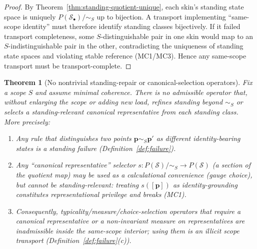 \documentclass[11pt]{article}
\newtheorem{theorem}[definition]{Theorem}
\theoremstyle{remark}
\newcommand{\Skin}{\mathcal{S}}
\begin{document}
\begin{proof}
By Theorem~\ref{thm:standing-quotient-unique}, each skin's standing state space is uniquely
$P(\Skin_\bullet)/\!\sim_S$ up to bijection.
A transport implementing ``same-scope identity'' must therefore identify standing classes bijectively.
If it failed transport completeness, some $S$-distinguishable pair in one skin would map to an
$S$-indistinguishable pair in the other, contradicting the uniqueness of standing state spaces and violating
stable reference (MC1/MC3). Hence any same-scope transport must be transport-complete.
\end{proof}

\begin{theorem}[No nontrivial standing-repair or canonical-selection operators]\label{thm:no-repair}
Fix a scope $S$ and assume minimal coherence.
There is no admissible operator that, without enlarging the scope or adding new load, refines standing beyond
$\sim_S$ or selects a standing-relevant canonical representative from each standing class.
More precisely:
\begin{enumerate}[label=(\roman*),leftmargin=2.2em]
\item Any rule that distinguishes two points $\mathbf{p}\sim_S\mathbf{p}'$ as different identity-bearing
states is a standing failure (Definition~\ref{def:failure}).
\item Any ``canonical representative'' selector $s:P(\Skin)/\!\sim_S\to P(\Skin)$ (a section of the quotient map)
may be used as a calculational convenience (gauge choice), but cannot be standing-relevant:
treating $s([\mathbf{p}])$ as identity-grounding constitutes representational privilege and breaks (MC1).
\item Consequently, typicality/measure/choice-selection operators that require a canonical representative or a
non-invariant measure on representatives are inadmissible inside the same-scope interior; using them is an
illicit scope transport (Definition~\ref{def:failure}(c)).
\end{enumerate}
\end{theorem}
\end{document}
